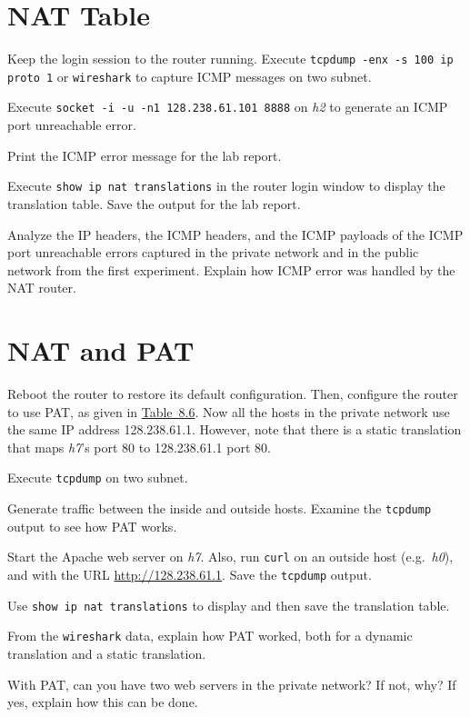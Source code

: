 \documentclass{../UTNetLab}
\begin{document}
\section{NAT Table}
    Keep the login session to the router running.
    Execute \lstinline[morekeywords={[3]proto}]{tcpdump -enx -s 100 ip proto 1} or \lstinline{wireshark} to capture ICMP messages on two subnet.

    Execute \lstinline{socket -i -u -n1 128.238.61.101 8888} on \textit{h2} to generate an ICMP port unreachable error.

    Print the ICMP error message for the lab report.

    Execute \lstinline[language=cisco]{show ip nat translations} in the router login window to display the translation table.
    Save the output for the lab report.

    \begin{report}
        \item Analyze the IP headers, the ICMP headers, and the ICMP payloads of the ICMP port unreachable errors captured in the private network and in the public network from the first experiment.
            Explain how ICMP error was handled by the NAT router.
    \end{report}

\section{NAT and PAT}
    Reboot the router to restore its default configuration.
    Then, configure the router to use PAT, as given in \hyperref[tab:8.6]{Table~8.6}.
    Now all the hosts in the private network use the same IP address 128.238.61.1.
    However, note that there is a static translation that maps \textit{h7}’s port 80 to 128.238.61.1 port 80.

    Execute \lstinline{tcpdump} on two subnet.

    Generate traffic between the inside and outside hosts.
    Examine the \lstinline{tcpdump} output to see how PAT works.

    Start the Apache web server on \textit{h7}.
    Also, run \lstinline[language=bash-ext]{curl} on an outside host (e.g.\ \textit{h0}), and with the URL \url{http://128.238.61.1}.
    Save the \lstinline{tcpdump} output.

    Use \lstinline[language={cisco}]{show ip nat translations} to display and then save the translation table.

    \begin{report}
        \item From the \lstinline{wireshark} data, explain how PAT worked, both for a dynamic translation and a static translation.
        
        \item With PAT, can you have two web servers in the private network?
    If not, why?
    If yes, explain how this can be done.
    \end{report}
\end{document}
